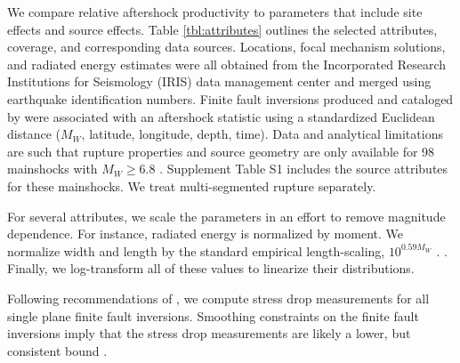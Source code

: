\documentclass[draft, jgrga]{agujournal2018}
\begin{document}

We compare relative aftershock productivity to parameters that include site effects and source effects. Table \ref{tbl:attributes} outlines the selected attributes, coverage, and corresponding data sources. Locations, focal mechanism solutions, and radiated energy estimates were all obtained from the Incorporated Research Institutions for Seismology (IRIS) data management center and merged using earthquake identification numbers. Finite fault inversions produced and cataloged by \citet{Hayes2017} were associated with an aftershock statistic using a standardized Euclidean distance ($M_W$, latitude, longitude, depth, time).
Data and analytical limitations are such that rupture properties and source geometry are only available for 98 mainshocks with $M_W\ge6.8$ \citep{Hayes2017}. Supplement Table S1 includes the source attributes for these mainshocks. We treat multi-segmented rupture separately.

For several attributes, we scale the parameters in an effort to remove magnitude dependence. For instance, radiated energy is normalized by moment. We normalize width and length by the standard empirical length-scaling, $10^{0.59M_W}$ \citep[][Table 2A - Subsurface rupture dimensions]{Wells1994}.  \citep[][Table 2A - Rupture area]{Wells1994}. Finally, we log-transform all of these values to linearize their distributions.

Following recommendations of \citet{Noda2013}, we compute stress drop measurements for all single plane finite fault inversions. Smoothing constraints on the finite fault inversions imply that the stress drop measurements are likely a lower, but consistent bound \citep{Adams2017ExploringInversions}.
\end{document}
